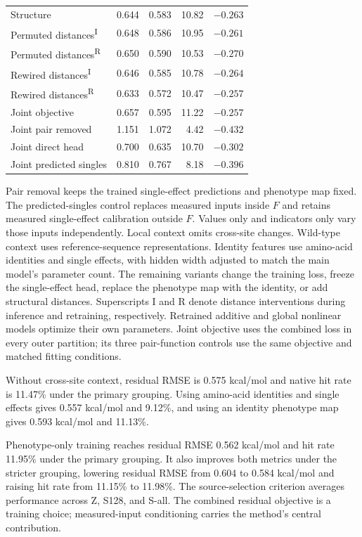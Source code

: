 \documentclass{llncs}
\begin{document}
\begin{table}[!htbp]
\begin{tabular}{lrrrr}
Structure & 0.644 & 0.583 & 10.82 & $-0.263$ \\
Permuted distances\textsuperscript{I} & 0.648 & 0.586 & 10.95 & $-0.261$ \\
Permuted distances\textsuperscript{R} & 0.650 & 0.590 & 10.53 & $-0.270$ \\
Rewired distances\textsuperscript{I} & 0.646 & 0.585 & 10.78 & $-0.264$ \\
Rewired distances\textsuperscript{R} & 0.633 & 0.572 & 10.47 & $-0.257$ \\
Joint objective & 0.657 & 0.595 & 11.22 & $-0.257$ \\
Joint pair removed & 1.151 & 1.072 & 4.42 & $-0.432$ \\
Joint direct head & 0.700 & 0.635 & 10.70 & $-0.302$ \\
Joint predicted singles & 0.810 & 0.767 & 8.18 & $-0.396$ \\
\bottomrule
\end{tabular}
\end{table}

Pair removal keeps the trained single-effect predictions and phenotype map fixed. The predicted-singles control replaces measured inputs inside $F$ and retains measured single-effect calibration outside $F$. Values only and indicators only vary those inputs independently. Local context omits cross-site changes. Wild-type context uses reference-sequence representations. Identity features use amino-acid identities and single effects, with hidden width adjusted to match the main model's parameter count. The remaining variants change the training loss, freeze the single-effect head, replace the phenotype map with the identity, or add structural distances. Superscripts I and R denote distance interventions during inference and retraining, respectively. Retrained additive and global nonlinear models optimize their own parameters. Joint objective uses the combined loss in every outer partition; its three pair-function controls use the same objective and matched fitting conditions.

Without cross-site context, residual RMSE is 0.575 kcal/mol and native hit rate is 11.47\% under the primary grouping. Using amino-acid identities and single effects gives 0.557 kcal/mol and 9.12\%, and using an identity phenotype map gives 0.593 kcal/mol and 11.13\%.

Phenotype-only training reaches residual RMSE 0.562 kcal/mol and hit rate 11.95\% under the primary grouping. It also improves both metrics under the stricter grouping, lowering residual RMSE from 0.604 to 0.584 kcal/mol and raising hit rate from 11.15\% to 11.98\%. The source-selection criterion averages performance across Z, S128, and S-all. The combined residual objective is a training choice; measured-input conditioning carries the method's central contribution.
\end{document}
